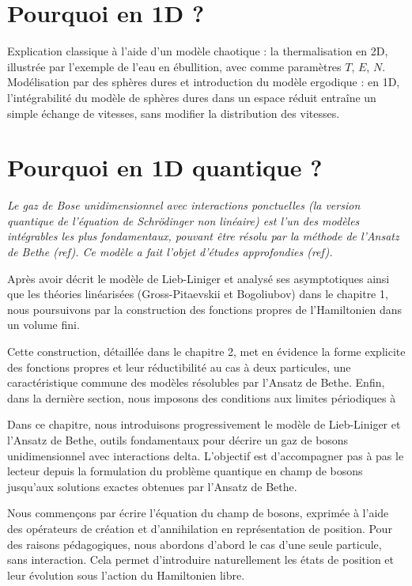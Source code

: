 \section*{Pourquoi en 1D ?}

{\em 

Explication classique à l’aide d’un modèle chaotique : la thermalisation en 2D, illustrée par l’exemple de l’eau en ébullition, avec comme paramètres \(T\), \(E\), \(N\). Modélisation par des sphères dures et introduction du modèle ergodique : en 1D, l’intégrabilité du modèle de sphères dures dans un espace réduit entraîne un simple échange de vitesses, sans modifier la distribution des vitesses.

}

\section*{Pourquoi en 1D quantique ?}

{\em 
Le gaz de Bose unidimensionnel avec interactions ponctuelles (la version quantique de l’équation de Schrödinger non linéaire) est l’un des modèles intégrables les plus fondamentaux, pouvant être résolu par la méthode de l’Ansatz de Bethe ({ref}). Ce modèle a fait l’objet d’études approfondies ({ref}).  

Après avoir décrit le modèle de Lieb-Liniger et analysé ses asymptotiques ainsi que les théories linéarisées (Gross-Pitaevskii et Bogoliubov) dans le chapitre 1, nous poursuivons par la construction des fonctions propres de l’Hamiltonien dans un volume fini.  

Cette construction, détaillée dans le chapitre 2, met en évidence la forme explicite des fonctions propres et leur réductibilité au cas à deux particules, une caractéristique commune des modèles résolubles par l’Ansatz de Bethe. Enfin, dans la dernière section, nous imposons des conditions aux limites périodiques à %
}


Dans ce chapitre, nous introduisons progressivement le modèle de Lieb-Liniger et l'Ansatz de Bethe, outils fondamentaux pour décrire un gaz de bosons unidimensionnel avec interactions delta. L'objectif est d'accompagner pas à pas le lecteur depuis la formulation du problème quantique en champ de bosons jusqu'aux solutions exactes obtenues par l'Ansatz de Bethe.

Nous commençons par écrire l'équation du champ de bosons, exprimée à l’aide des opérateurs de création et d’annihilation en représentation de position. Pour des raisons pédagogiques, nous abordons d’abord le cas d’une seule particule, sans interaction. Cela permet d’introduire naturellement les états de position et leur évolution sous l’action du Hamiltonien libre.

